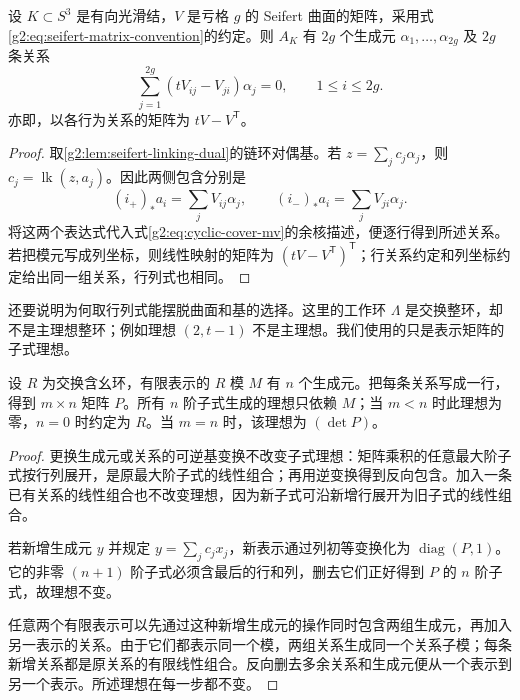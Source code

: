 \begin{theorem}\label{g2:thm:seifert-alexander-presentation}
	设 \(K\subset S^3\) 是有向光滑结，\(V\) 是亏格 \(g\) 的 Seifert 曲面的矩阵，采用式\eqref{g2:eq:seifert-matrix-convention}的约定。则 \(A_K\) 有 \(2g\) 个生成元 \(\alpha_1,\ldots,\alpha_{2g}\) 及 \(2g\) 条关系
	\begin{equation}\label{g2:eq:alexander-seifert-relations}
		\sum_{j=1}^{2g}(tV_{ij}-V_{ji})\alpha_j=0,
		\qquad 1\leq i\leq2g.
	\end{equation}
	亦即，以各行为关系的矩阵为 \(tV-V^{\mathsf T}\)。
\end{theorem}
\begin{proof}
	取\cref{g2:lem:seifert-linking-dual}的链环对偶基。若 \(z=\sum_jc_j\alpha_j\)，则 \(c_j=\operatorname{lk}(z,a_j)\)。因此两侧包含分别是
	\[
		(i_+)_*a_i=\sum_jV_{ij}\alpha_j,
		\qquad(i_-)_*a_i=\sum_jV_{ji}\alpha_j.
	\]
	将这两个表达式代入式\eqref{g2:eq:cyclic-cover-mv}的余核描述，便逐行得到所述关系。若把模元写成列坐标，则线性映射的矩阵为 \((tV-V^{\mathsf T})^{\mathsf T}\)；行关系约定和列坐标约定给出同一组关系，行列式也相同。
\end{proof}

还要说明为何取行列式能摆脱曲面和基的选择。这里的工作环 \(\Lambda\) 是交换整环，却不是主理想整环；例如理想 \((2,t-1)\) 不是主理想。我们使用的只是表示矩阵的子式理想。

\begin{lemma}\label{g2:lem:module-order-ideal}
	设 \(R\) 为交换含幺环，有限表示的 \(R\) 模 \(M\) 有 \(n\) 个生成元。把每条关系写成一行，得到 \(m\times n\) 矩阵 \(P\)。所有 \(n\) 阶子式生成的理想只依赖 \(M\)；当 \(m<n\) 时此理想为零，\(n=0\) 时约定为 \(R\)。当 \(m=n\) 时，该理想为 \((\det P)\)。
\end{lemma}
\begin{proof}
	更换生成元或关系的可逆基变换不改变子式理想：矩阵乘积的任意最大阶子式按行列展开，是原最大阶子式的线性组合；再用逆变换得到反向包含。加入一条已有关系的线性组合也不改变理想，因为新子式可沿新增行展开为旧子式的线性组合。

	若新增生成元 \(y\) 并规定 \(y=\sum_jc_jx_j\)，新表示通过列初等变换化为 \(\operatorname{diag}(P,1)\)。它的非零 \((n+1)\) 阶子式必须含最后的行和列，删去它们正好得到 \(P\) 的 \(n\) 阶子式，故理想不变。

	任意两个有限表示可以先通过这种新增生成元的操作同时包含两组生成元，再加入另一表示的关系。由于它们都表示同一个模，两组关系生成同一个关系子模；每条新增关系都是原关系的有限线性组合。反向删去多余关系和生成元便从一个表示到另一个表示。所述理想在每一步都不变。
\end{proof}

